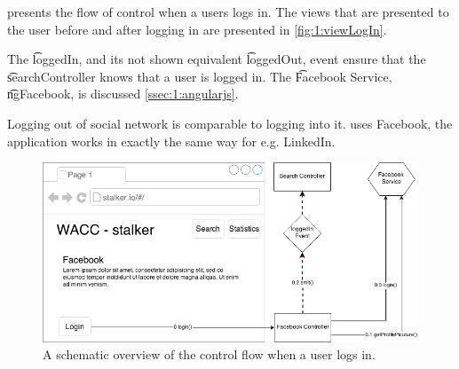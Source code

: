 		 presents the flow of control when a users logs in. The views that are presented to the user before and after logging in are presented in \cref{fig:1:viewLogIn}.

		The \t{loggedIn}, and its not shown equivalent \t{loggedOut}, event ensure that the \t{searchController} knows that a user is logged in. The \t{Facebook Service}, \t{ngFacebook}, is discussed \vref{ssec:1:angularjs}. 

		Logging out of social network is comparable to logging into it.  uses Facebook, the application works in exactly the same way for e.g. LinkedIn.

		\begin{figure}
			\includegraphics[width=\textwidth]{./img/1_login_flow}
			\caption{A schematic overview of the control flow when a user logs in.}
			\label{fig:1:controlflowLogIn}
		\end{figure}

